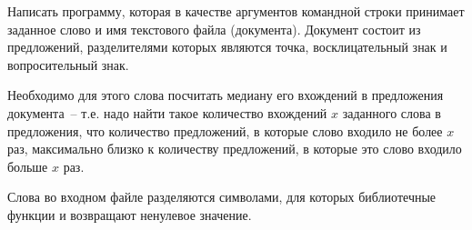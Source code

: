 Написать программу, которая в качестве аргументов командной строки
принимает заданное слово и имя текстового файла (документа).
Документ
состоит из предложений, разделителями которых являются точка,
восклицательный знак и вопросительный знак.

Необходимо для этого
слова посчитать медиану его вхождений в предложения документа~-- т.е.
надо найти такое количество вхождений $x$ заданного слова в
предложения, что количество предложений, в которые слово входило не
более $x$ раз, максимально близко к количеству предложений, в которые это
слово входило больше $x$ раз.

Слова во входном файле разделяются символами, для которых
библиотечные функции  и  возвращают ненулевое
значение.
